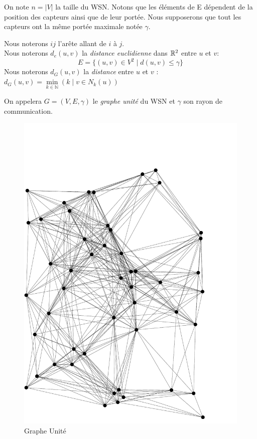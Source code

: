  On note $ n=|V| $ la taille du WSN. Notons que les éléments de E dépendent de la
 position des capteurs ainsi que de leur portée. Nous supposerons que tout les capteurs ont la même portée maximale notée $\gamma$. 


\begin{mydef}
Nous noterons $ij$ l'arête allant de $i$ à $j$. \\
Nous noterons $d_e(u,v)$ la \textit{distance euclidienne} dans $\mathbb{R} \textsuperscript{2}$ entre $u$ et $v$:
$$E = \{ (u,v) \in V ^{2} \mid d(u,v) \leq \gamma \}$$
Nous noterons $d_G(u,v)$ la \textit{distance} entre $ u $ et $ v $ : $d_G(u,v)= \min\limits_{k \in \mathbb{N}}(k \mid v \in N_k(u))$
\end{mydef}


\begin{mydef}
 On appelera $G= (V,E,\gamma)$ le \textit{graphe unité} du WSN et $\gamma$ son rayon de communication.
\end{mydef}


\begin{figure}[h]
\centering
\includegraphics[angle=90, scale= 0.35]{Etat_de_l'art/source/GrapheUnit.pdf} 
\caption{\label{Layer} Graphe Unité}
\end{figure}

